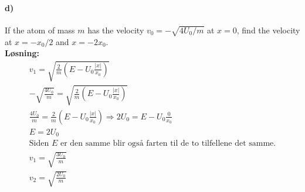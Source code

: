 \documentclass[11pt, A4paper,norsk]{article}
\begin{document}
		\paragraph{d)}
			\begin{flushleft}
If the atom of mass $m$ has the velocity $v_0 = -\sqrt{4U_0/m}$ at $x = 0$, find the velocity at $x = -x_0/2$ and $x = -2x_0$. \\
\vspace{1mm}
\textbf{Løsning:} \\
\vspace{1mm}
				\begin{align}
v_1 = \sqrt{\frac{2}{m} \left(E - U_0\frac{|x|}{x_0} \right)} \nonumber \\
-\sqrt{\frac{4U_0}{m}} = \sqrt{\frac{2}{m} \left(E - U_0 \frac{|x|}{x_0} \right)} \nonumber \\
\frac{4U_0}{m} = \frac{2}{m}\left(E - U_0 \frac{|x|}{x_0}\right) \Rightarrow 2U_0 = E - U_0 \frac{0}{x_0} \nonumber \\
E = 2U_0 \nonumber \\
\text{Siden $E$ er den samme blir også farten til de to tilfellene det samme.} \nonumber \\
v_1 = \sqrt{\frac{3U_0}{m}} \nonumber \\
v_2 = \sqrt{\frac{2U_0}{m}} \nonumber 
				\end{align}
			\end{flushleft}
\end{document}
